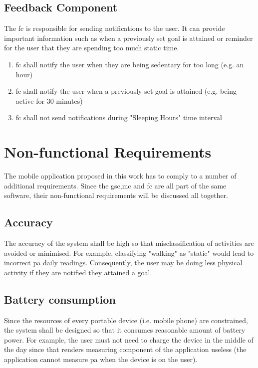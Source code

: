     \subsection{Feedback Component}
    The \gls{fc} is responsible for sending notifications to the user. It can provide important information such as when a previously set goal is attained or reminder for the user that they are spending too much static time.
    \begin{enumerate}
        \item \gls{fc} shall notify the user when they are being sedentary for too long (e.g. an hour)
        
        \item \gls{fc} shall notify the user when a previously set goal is attained (e.g. being active for 30 minutes)
        
        \item \gls{fc} shall not send notifications during "Sleeping Hours" time interval
    \end{enumerate}

\section{Non-functional Requirements}
The mobile application proposed in this work has to comply to a number of additional requirements. Since the \gls{gsc},\gls{mc} and \gls{fc} are all part of the same software, their non-functional requirements will be discussed all together.
    
    
    \subsection{Accuracy}
    The accuracy of the system shall be high so that misclassification of activities are avoided or minimised. For example, classifying "walking" as "static" would lead to incorrect \gls{pa} daily readings. Consequently, the user may be doing less physical activity if they are notified they attained a goal.
    
    \subsection{Battery consumption}
    Since the resources of every portable device (i.e. mobile phone) are constrained, the system shall be designed so that it consumes reasonable amount of battery power. For example, the user must not need to charge the device in the middle of the day since that renders measuring component of the application useless (the application cannot measure \gls{pa} when the device is on the user).
    
